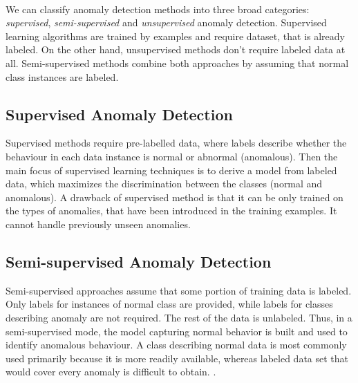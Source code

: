 
\\
We can classify anomaly detection methods into three broad categories: \textit{supervised}, \textit{semi-supervised} and \textit{unsupervised} anomaly detection. Supervised learning algorithms are trained by examples and require dataset, that is already labeled. On the other hand, unsupervised methods don't require labeled data at all. Semi-supervised methods combine both approaches by assuming that normal class instances are labeled.


\subsection{Supervised Anomaly Detection}
Supervised methods require pre-labelled data, where labels describe whether the behaviour in each data instance is normal or abnormal (anomalous). Then the main focus of supervised learning techniques is to derive a model from labeled data, which maximizes the discrimination between the classes (normal and anomalous). A drawback of supervised method is that it can be only trained on the types of anomalies, that have been introduced in the training examples. It cannot handle previously unseen anomalies. 

 \subsection{Semi-supervised Anomaly Detection}
 Semi-supervised approaches assume that some portion of training data is labeled. Only labels for instances of normal class are provided, while labels for classes describing anomaly are not required. The rest of the data is unlabeled. Thus, in a semi-supervised mode, the model capturing normal behavior is built and used to identify anomalous behaviour. A class describing normal data is most commonly used primarily because it is more readily available, whereas labeled data set that would cover every anomaly is difficult to obtain.  \cite{anomalyDetectionSurvey}. 
 
